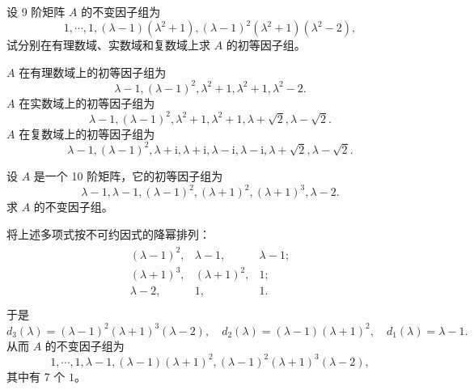 \documentclass[../../main.tex]{subfiles}%
\begin{document}
\begin{example}
设 9 阶矩阵 $A$ 的不变因子组为
\[
1,\cdots,1,(\lambda - 1)(\lambda^2 + 1),(\lambda - 1)^2(\lambda^2 + 1)(\lambda^2 - 2),
\]
试分别在有理数域、实数域和复数域上求 $A$ 的初等因子组。
\end{example}
\begin{solution}

$A$ 在有理数域上的初等因子组为
\[
\lambda - 1,(\lambda - 1)^2,\lambda^2 + 1,\lambda^2 + 1,\lambda^2 - 2.
\]
$A$ 在实数域上的初等因子组为
\[
\lambda - 1,(\lambda - 1)^2,\lambda^2 + 1,\lambda^2 + 1,\lambda + \sqrt{2},\lambda - \sqrt{2}.
\]
$A$ 在复数域上的初等因子组为
\[
\lambda - 1,(\lambda - 1)^2,\lambda + \mathrm{i},\lambda + \mathrm{i},\lambda - \mathrm{i},\lambda - \mathrm{i},\lambda + \sqrt{2},\lambda - \sqrt{2}.
\]

\end{solution}

\begin{example}
设 $A$ 是一个 10 阶矩阵，它的初等因子组为
\[
\lambda - 1,\lambda - 1,(\lambda - 1)^2,(\lambda + 1)^2,(\lambda + 1)^3,\lambda - 2.
\]
求 $A$ 的不变因子组。
\end{example}
\begin{solution}

将上述多项式按不可约因式的降幂排列：
\begin{align*}
\begin{matrix}
(\lambda -1)^2,&		\lambda -1,&		\lambda -1;\\
(\lambda +1)^3,&		(\lambda +1)^2,&		1;\\
\lambda -2,&		1,&		1.\\
\end{matrix}
\end{align*}
于是
\[
d_3(\lambda)=(\lambda - 1)^2(\lambda + 1)^3(\lambda - 2),\quad d_2(\lambda)=(\lambda - 1)(\lambda + 1)^2,\quad d_1(\lambda)=\lambda - 1.
\]
从而 $A$ 的不变因子组为
\[
1,\cdots,1,\lambda - 1,(\lambda - 1)(\lambda + 1)^2,(\lambda - 1)^2(\lambda + 1)^3(\lambda - 2),
\]
其中有 7 个 $1$。 

\end{solution}
\end{document}
